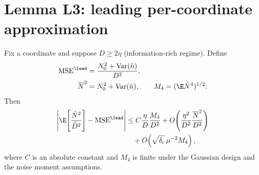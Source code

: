 \section{Lemma L3: leading per-coordinate approximation}
\label{supp:l3}

\begin{lemma}\label{supp:l3lem}
Fix a coordinate and suppose $D \ge 2\eta$ (information-rich regime).
Define
\begin{align}
  \mathrm{MSE}^{\lead} &= \frac{N_0^2 + \mathrm{Var}(\tilde n)}{D^2}, \notag\\
  \overline N^2 &= N_0^2 + \mathrm{Var}(\tilde n),
  \qquad M_4=(\E\hat N^4)^{1/2}.
  \label{supp:eq:mselead}
\end{align}
Then
\begin{align}
  \left|\E\!\left[\frac{\hat N^2}{\hat D^2}\right]-\mathrm{MSE}^{\lead}\right|
  &\le C\frac{\eta}{D}\frac{M_4}{D^2}
  +O\!\left(\frac{\eta^2}{D^2}\frac{\overline N^2}{D^2}\right) \notag\\
  &\quad+O\!\left(\sqrt{\delta_c}\,\mu^{-2}M_4\right),
  \label{supp:eq:l3bound}
\end{align}
where $C$ is an absolute constant and $M_4$ is finite under the Gaussian design and the noise moment assumptions.
\end{lemma}

